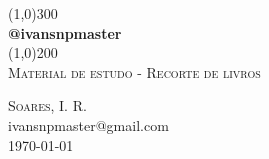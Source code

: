 \begin{titlepage}
	\begin{center}
		\line(1,0){300} \\
		[0.25in]
		\huge{\bfseries @ivansnpmaster} \\
		[2mm]
		\line(1,0){200} \\
		[1.5cm]
		\textsc{\large Material de estudo - Recorte de livros} \\
		[9cm]
	\end{center}
	
	\begin{flushright}
		\textsc{\large Soares, I. R.} \\
		ivansnpmaster@gmail.com \\
		\today
	\end{flushright}


\end{titlepage}

\clearpage
\setcounter{page}{1}
